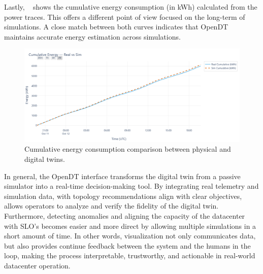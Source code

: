 Lastly, ~ shows the cumulative energy consumption (in kWh) calculated from the power traces. This offers a different point of view focused on the long-term of simulations. A close match between both curves indicates that OpenDT maintains accurate energy estimation across simulations.

\begin{figure}[h]
    \centering
    \includegraphics[width=\linewidth]{figures/energy_plot.png}
    \caption{Cumulative energy consumption comparison between physical and digital twins.}
    \label{fig:energy_plot}
\end{figure}

In general, the OpenDT interface transforms the digital twin from a passive simulator into a real-time decision-making tool. By integrating real telemetry and simulation data, with topology recommendations align with clear objectives, allows operators to analyze and verify the fidelity of the digital twin. Furthermore, detecting anomalies and aligning the capacity of the datacenter with SLO's becomes easier and more direct by allowing multiple simulations in a short amount of time. In other words, visualization not only communicates data, but also provides continue feedback between the system and the humans in the loop, making the process interpretable, trustworthy, and actionable in real-world datacenter operation.